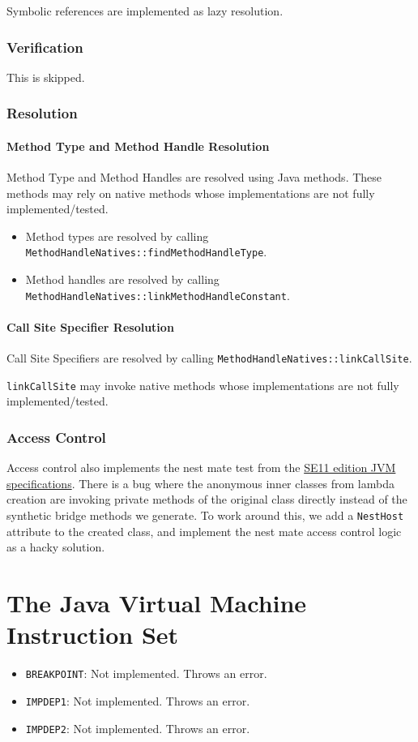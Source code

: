 Symbolic references are implemented as lazy resolution.

\subsubsection{Verification}

This is skipped.

\addtocounter{subsubsection}{1}
\subsubsection{Resolution}

\addtocounter{paragraph}{4}
\paragraph{Method Type and Method Handle Resolution}

Method Type and Method Handles are resolved using Java methods. These methods may rely on native methods whose implementations are not fully implemented/tested.
\begin{itemize}
	\item Method types are resolved by calling \texttt{MethodHandleNatives::findMethodHandleType}.
	\item Method handles are resolved by calling \texttt{MethodHandleNatives::linkMethodHandleConstant}.
\end{itemize}

\paragraph{Call Site Specifier Resolution}

Call Site Specifiers are resolved by calling \texttt{MethodHandleNatives::linkCallSite}.

\texttt{linkCallSite} may invoke native methods whose implementations are not fully implemented/tested.

\subsubsection{Access Control}

Access control also implements the nest mate test from the \href{https://docs.oracle.com/javase/specs/jvms/se11/html/jvms-5.html#jvms-5.4.4}{SE11 edition JVM specifications}. 
There is a bug where the anonymous inner classes from lambda creation are invoking private methods of the original class directly instead of the synthetic bridge methods we generate.
To work around this, we add a \texttt{NestHost} attribute to the created class, and implement the nest mate access control logic as a hacky solution.

\section{The Java Virtual Machine Instruction Set}

\begin{itemize}
\item \texttt{BREAKPOINT}: Not implemented. Throws an error.
\item \texttt{IMPDEP1}: Not implemented. Throws an error.
\item \texttt{IMPDEP2}: Not implemented. Throws an error.
\end{itemize}


